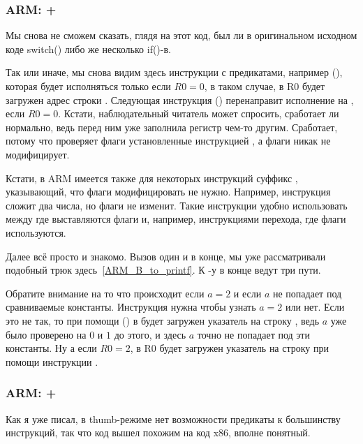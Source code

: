 ﻿\subsubsection{ARM: \OptimizingKeil + \ARMMode}



Мы снова не сможем сказать, глядя на этот код, был ли в оригинальном исходном коде switch() либо же несколько
if()-в.

Так или иначе, мы снова видим здесь инструкции с предикатами, например  (), 
которая будет исполняться только
если $R0=0$, в таком случае, в R0 будет загружен адрес строки . 
Следующая инструкция  () перенаправит
исполнение на , если $R0=0$. 
Кстати, наблюдательный читатель может спросить, сработает ли  нормально,
ведь  перед ним уже заполнила регистр  чем-то другим. 
Сработает, потому что  проверяет флаги установленные
инструкцией \CMP, а  флаги никак не модифицирует.

Кстати, в ARM имеется также для некоторых инструкций суффикс , указывающий, что флаги модифицировать не нужно.
Например, инструкция  сложит два числа, но флаги не изменит. Такие инструкции удобно использовать
между \CMP где выставляются флаги и, например, инструкциями перехода, где флаги используются.

Далее всё просто и знакомо. Вызов \printf один и в конце, мы уже рассматривали подобный трюк 
здесь~\ref{ARM_B_to_printf}. К \printf{}-у в конце ведут три пути. 

Обратите внимание на то что происходит
если $a=2$ и если $a$ не попадает под сравниваемые константы. Инструкция  нужна чтобы узнать
$a=2$ или нет. Если это не так, то при помощи  () в  будет загружен указатель на 
строку ,
ведь $a$ уже было проверено на $0$ и $1$ до этого, и здесь $a$ точно не попадает под эти константы. 
Ну а если $R0=2$,
в R0 будет загружен указатель на строку  при помощи инструкции .

\subsubsection{ARM: \OptimizingKeil + \ThumbMode}



Как я уже писал, в thumb-режиме нет возможности  предикаты к большинству инструкций,
так что код вышел похожим на код x86, вполне понятный.

